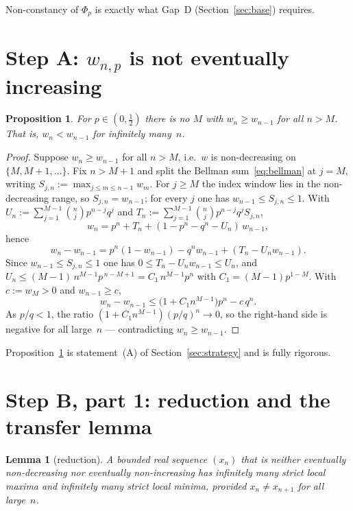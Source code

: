 \documentclass[11pt]{article}
\newtheorem{proposition}[theorem]{Proposition}
\newtheorem{lemma}[theorem]{Lemma}
\theoremstyle{definition}
\begin{document}
Non-constancy of $\Phi_p$ is exactly what Gap~D
(Section~\ref{sec:base}) requires.

\section{Step A: \texorpdfstring{$w_{n,p}$}{w(n,p)} is not eventually
  increasing}\label{sec:A}

\begin{proposition}\label{prop:A}
  For $p\in(0,\tfrac12)$ there is no $M$ with $w_n\ge w_{n-1}$ for all
  $n>M$. That is, $w_n<w_{n-1}$ for infinitely many~$n$.
\end{proposition}

\begin{proof}
  Suppose $w_n\ge w_{n-1}$ for all $n>M$, i.e.\ $w$ is non-decreasing
  on $\{M,M+1,\dots\}$. Fix $n>M+1$ and split the Bellman
  sum~\eqref{eq:bellman} at $j=M$, writing $S_{j,n}:=\max_{j\le m\le
  n-1}w_m$. For $j\ge M$ the index window lies in the non-decreasing
  range, so $S_{j,n}=w_{n-1}$; for every $j$ one has $w_{n-1}\le
  S_{j,n}\le1$. With $U_n:=\sum_{j=1}^{M-1}\binom nj p^{n-j}q^j$ and
  $T_n:=\sum_{j=1}^{M-1}\binom nj p^{n-j}q^j S_{j,n}$,
  \[
    w_n=p^n+T_n+(1-p^n-q^n-U_n)\,w_{n-1},
  \]
  hence
  \[
    w_n-w_{n-1}=p^n(1-w_{n-1})-q^n w_{n-1}+(T_n-U_n w_{n-1}).
  \]
  Since $w_{n-1}\le S_{j,n}\le1$ one has $0\le T_n-U_nw_{n-1}\le U_n$,
  and $U_n\le(M-1)\,n^{M-1}p^{\,n-M+1}=C_1\,n^{M-1}p^n$ with
  $C_1=(M-1)p^{1-M}$. With $c:=w_M>0$ and $w_{n-1}\ge c$,
  \[
    w_n-w_{n-1}\le\bigl(1+C_1n^{M-1}\bigr)p^n-c\,q^n .
  \]
  As $p/q<1$, the ratio $(1+C_1n^{M-1})(p/q)^n\to0$, so the
  right-hand side is negative for all large~$n$ --- contradicting
  $w_n\ge w_{n-1}$.
\end{proof}

Proposition~\ref{prop:A} is statement~(A) of
Section~\ref{sec:strategy} and is fully rigorous.

\section{Step B, part 1: reduction and the transfer
  lemma}\label{sec:transfer}

\begin{lemma}[reduction]\label{lem:reduction}
  A bounded real sequence $(x_n)$ that is neither eventually
  non-decreasing nor eventually non-increasing has infinitely many
  strict local maxima and infinitely many strict local minima,
  provided $x_n\ne x_{n+1}$ for all large~$n$.
\end{lemma}
\end{document}

